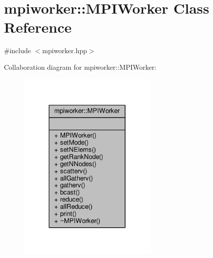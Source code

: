 \hypertarget{classmpiworker_1_1MPIWorker}{\section{mpiworker\-:\-:M\-P\-I\-Worker Class Reference}
\label{classmpiworker_1_1MPIWorker}
}


{\ttfamily \#include $<$mpiworker.\-hpp$>$}



Collaboration diagram for mpiworker\-:\-:M\-P\-I\-Worker\-:\nopagebreak
\begin{figure}[H]
\begin{center}
\leavevmode
\includegraphics[width=196pt]{classmpiworker_1_1MPIWorker__coll__graph}
\end{center}
\end{figure}
